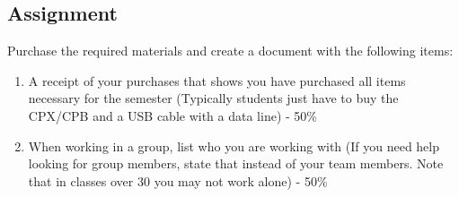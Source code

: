\subsection{Assignment}
Purchase the required materials and create a document with the following items:
\begin{enumerate}[itemsep=-5pt]
\item A receipt of your purchases that shows you have purchased all items necessary for the semester (Typically students just have to buy the CPX/CPB and a USB cable with a data line) - 50\%
\item When working in a group, list who you are working with (If you need help looking for group members, state that instead of your team members. Note that in classes over 30 you may not work alone) - 50\%
\end{enumerate}




